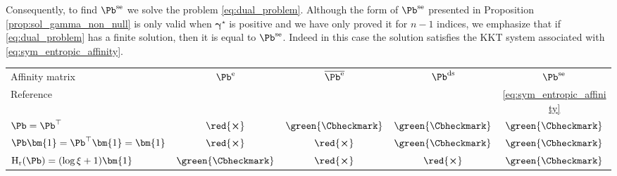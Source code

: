 \begin{minipage}{0.47\linewidth}
  Consequently, to find $\Pb^{\mathrm{se}}$ we solve the problem \eqref{eq:dual_problem}. Although the form of $\Pb^{\mathrm{se}}$ presented in Proposition \ref{prop:sol_gamma_non_null} is only valid when $\bm{\gamma}^\star$ is positive and we have only proved it for $n-1$ indices, we emphasize that if \eqref{eq:dual_problem} has a finite solution, then it is equal to $\Pb^{\mathrm{se}}$. Indeed in this case the solution satisfies the KKT system associated with \eqref{eq:sym_entropic_affinity}.
\end{minipage}
\hspace{0.005\linewidth}
\begin{minipage}{0.5\linewidth} 
  \vspace{-0.1cm}
  \begin{sc} \setlength\tabcolsep{1mm}
  \vspace{-0.1cm}
  \begin{tabular}{lcccc}
  \toprule[1.5pt]
  Affinity matrix& $\Pb^{\mathrm{e}}$& $\overline{\Pb^{\mathrm{e}}}$
  & $\Pb^{\mathrm{ds}}$& $\Pb^{\mathrm{se}}$ \\
  Reference & \cite{hinton2002stochastic} & \citep{van2008visualizing} & \cite{lu2019doubly} & \eqref{eq:sym_entropic_affinity} \\
  \midrule
  $\Pb=\Pb^\top$ & $\red{\boldsymbol\times}$ & $\green{\Cbheckmark}$ & $\green{\Cbheckmark}$ & $\green{\Cbheckmark}$ \\
  $\Pb \bm{1} = \Pb^\top \bm{1} = \bm{1}$ & $\red{\boldsymbol\times}$ & $\red{\boldsymbol\times}$ & $\green{\Cbheckmark}$ & $\green{\Cbheckmark}$ \\
  $\operatorname{H}_{\mathrm{r}}(\Pb) = (\log \xi + 1)\bm{1}$ & $\green{\Cbheckmark}$ & $\red{\boldsymbol\times}$ & $\red{\boldsymbol\times}$ & $\green{\Cbheckmark}$ \\
  \bottomrule[1.5pt]
  \end{tabular}
  \end{sc}
\end{minipage}


